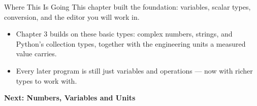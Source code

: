 \documentclass[9pt,aspectratio=169,xcolor=table]{beamer}
\begin{document}
\begin{frame}{Where This Is Going}
    \leavevmode
    \small
    This chapter built the foundation: variables, scalar types,
    conversion, and the editor you will work in.

    \vspace{3mm}
    \begin{itemize}
        \item Chapter 3 builds on these basic types: complex numbers,
              strings, and Python's collection types, together with the
              engineering units a measured value carries.
        \item Every later program is still just variables and
              operations --- now with richer types to work with.
    \end{itemize}

    \vspace{4mm}
    \begin{center}
        \large\color{primary}\textbf{Next: Numbers, Variables and Units}
    \end{center}
\end{frame}
\end{document}
